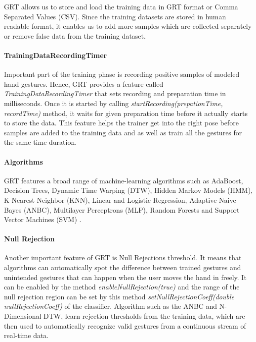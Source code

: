 GRT allows us to store and load the training data in GRT format or Comma Separated Values (CSV). Since the training datasets are stored in human readable format, it enables us to add more samples which are collected separately or remove false data from the training dataset.

\paragraph*{TrainingDataRecordingTimer} Important part of the training phase is recording positive samples of modeled hand gestures. Hence, GRT provides a feature called \textit{TrainingDataRecordingTimer} that sets recording and preparation time in milliseconds. Once it is started by calling \textit{startRecording(prepationTime, recordTime)} method, it waits for given preparation time before it actually starts to store the data. This feature helps the trainer get into the right pose before samples are added to the training data and as well as train all the gestures for the same time duration.

\paragraph*{Algorithms} GRT features a broad range of machine-learning algorithms such as AdaBoost, Decision Trees, Dynamic Time Warping (DTW), Hidden Markov Models (HMM), K-Nearest Neighbor (KNN), Linear and Logistic Regression, Adaptive Naive Bayes (ANBC), Multilayer Perceptrons (MLP), Random Forests and Support Vector Machines (SVM) \cite{16}. 

\paragraph*{Null Rejection} Another important feature of GRT is Null Rejections threshold. It means that algorithms can automatically spot the difference between trained gestures and unintended gestures that can happen when the user moves the hand in freely. It can be enabled by the method \textit{enableNullRejection(true)} and the range of the null rejection region can be set by this method \textit{setNullRejectionCoeff(double nullRejectionCoeff)} of the classifier. Algorithm such as the ANBC and N-Dimensional DTW, learn rejection thresholds from the training data, which are then used to automatically recognize valid gestures from a continuous stream of real-time data.



